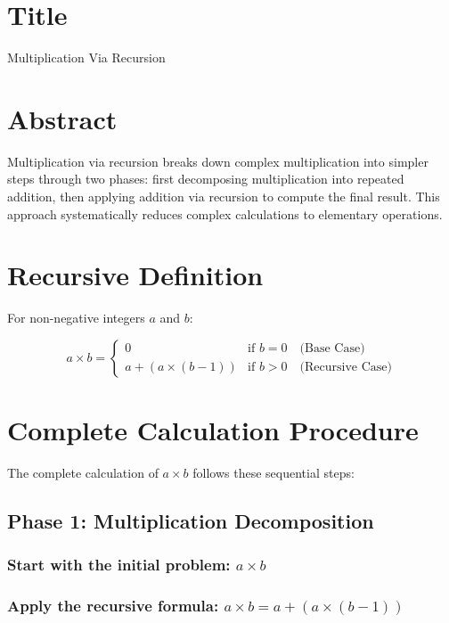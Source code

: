 \documentclass{article}
\begin{document}
\section{Title}
Multiplication Via Recursion

\section{Abstract}
Multiplication via recursion breaks down complex multiplication into simpler steps through two phases: first decomposing multiplication into repeated addition, then applying addition via recursion to compute the final result. This approach systematically reduces complex calculations to elementary operations.

\section{Recursive Definition}
For non-negative integers \(a\) and \(b\):

\[
    a \times b = \begin{cases}
        0                      & \text{if } b = 0 \quad \text{(Base Case)}      \\
        a + (a \times (b - 1)) & \text{if } b > 0 \quad \text{(Recursive Case)}
    \end{cases}
\]

\section{Complete Calculation Procedure}
The complete calculation of \(a \times b\) follows these sequential steps:

\subsection{Phase 1: Multiplication Decomposition}
\subsubsection{Start with the initial problem: \(a \times b\)}
\subsubsection{Apply the recursive formula: \(a \times b = a + (a \times (b-1))\)}
\end{document}
